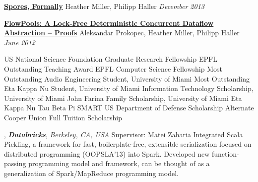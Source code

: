\documentclass[9pt]{article}
\begin{document}
\noindent\href{http://infoscience.epfl.ch/record/191240}{\bf Spores, Formally}\dates{}\vspace{-0.03in}
\newline\noindent Heather Miller, Philipp Haller
\newline\noindent\emph{December 2013}
\bigskip

\noindent\href{http://infoscience.epfl.ch/record/181098}{\bf  FlowPools: A Lock-Free Deterministic Concurrent Dataflow Abstraction -- Proofs}\dates{}\vspace{-0.03in}
\newline\noindent Aleksandar Prokopec, Heather Miller, Philipp Haller
\newline\noindent\emph{June 2012}
\bigskip

\medskip
{}

\noindent US National Science Foundation Graduate Research Fellowship 
\newline\noindent EPFL Outstanding Teaching Award 
\newline\noindent EPFL Computer Science Fellowship 
\newline\noindent Most Outstanding Audio Engineering Student, University of Miami 
\newline\noindent Most Outstanding Eta Kappa Nu Student, University of Miami 
\newline\noindent Information Technology Scholarship, University of Miami 
\newline\noindent John Farina Family Scholarship, University of Miami 
\newline\noindent Eta Kappa Nu 
\newline\noindent Tau Beta Pi 
\newline\noindent SMART US Department of Defense Scholarship Alternate 
\newline\noindent Cooper Union Full Tuition Scholarship 

\bigskip

\newpage

\medskip
{}

, {\bf \em Databricks}, \emph{Berkeley, CA, USA} \vspace{0.01in} 
\newline\noindent Supervisor: Matei Zaharia
\newline\noindent Integrated Scala Pickling, a framework for fast, boilerplate-free, extensible
\newline\noindent serialization focused on distributed programming (OOPSLA'13) into Spark.
\newline\noindent Developed new function-passing programming model and framework, can be
\newline\noindent thought of as a generalization of Spark/MapReduce programming model.
\bigskip
\end{document}
